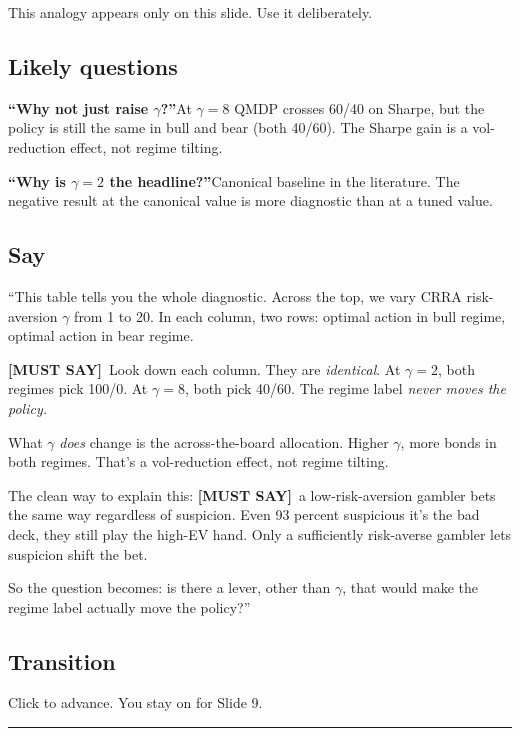 \documentclass[11pt]{article}
\newcommand{\mustsay}[1]{\textcolor{must}{\textbf{[MUST SAY]}}\ #1}
\begin{document}
This analogy appears only on this slide. Use it deliberately.

\subsection*{Likely questions}

\textbf{``Why not just raise $\gamma$?''}\quad At $\gamma = 8$ QMDP crosses 60/40 on Sharpe, but the policy is still the same in bull and bear (both 40/60). The Sharpe gain is a vol-reduction effect, not regime tilting.

\textbf{``Why is $\gamma = 2$ the headline?''}\quad Canonical baseline in the literature. The negative result at the canonical value is more diagnostic than at a tuned value.

\subsection*{Say}

``This table tells you the whole diagnostic. Across the top, we vary CRRA risk-aversion $\gamma$ from 1 to 20. In each column, two rows: optimal action in bull regime, optimal action in bear regime.

\mustsay{Look down each column. They are \emph{identical}. At $\gamma = 2$, both regimes pick 100/0. At $\gamma = 8$, both pick 40/60. The regime label \emph{never moves the policy.}}

What $\gamma$ \emph{does} change is the across-the-board allocation. Higher $\gamma$, more bonds in both regimes. That's a vol-reduction effect, not regime tilting.

The clean way to explain this: \mustsay{a low-risk-aversion gambler bets the same way regardless of suspicion. Even 93 percent suspicious it's the bad deck, they still play the high-EV hand. Only a sufficiently risk-averse gambler lets suspicion shift the bet.}

So the question becomes: is there a lever, other than $\gamma$, that would make the regime label actually move the policy?''

\subsection*{Transition}

Click to advance. You stay on for Slide 9.

\bigskip\hrule

\end{document}
